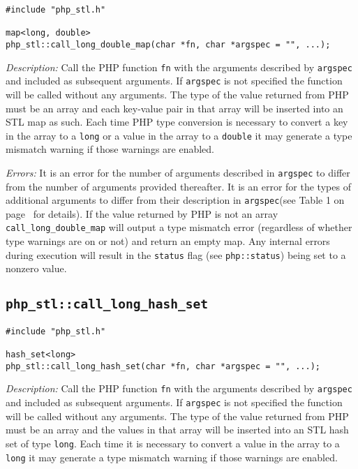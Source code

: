 \documentclass[11pt,titlepage]{article}
\begin{document}
\begin{verbatim}
#include "php_stl.h"

map<long, double> 
php_stl::call_long_double_map(char *fn, char *argspec = "", ...);
\end{verbatim}

\emph{Description:} Call the PHP function \verb|fn| with the arguments described by \verb|argspec| and included as subsequent arguments. If \verb|argspec| is not specified the function will be called without any arguments. The type of the value returned from PHP must be an array and each key-value pair in that array will be inserted into an STL map as such. Each time PHP type conversion is necessary to convert a key in the array to a \verb|long| or a value in the array to a \verb|double| it may generate a type mismatch warning if those warnings are enabled.

\emph{Errors:} It is an error for the number of arguments described in \verb|argspec| to differ from the number of arguments provided thereafter. It is an error for the types of additional arguments to differ from their description in \verb|argspec|(see Table 1 on page~\pageref{Table1} for details). If the value returned by PHP is not an array \verb|call_long_double_map| will output a type mismatch error (regardless of whether type warnings are on or not) and return an empty map. Any internal errors during execution will result in the \verb|status| flag (see \verb|php::status|) being set to a nonzero value.


\subsection{\texttt{php\_stl::call\_long\_hash\_set}}

\begin{verbatim}
#include "php_stl.h"

hash_set<long> 
php_stl::call_long_hash_set(char *fn, char *argspec = "", ...);
\end{verbatim}

\emph{Description:} Call the PHP function \verb|fn| with the arguments described by \verb|argspec| and included as subsequent arguments. If \verb|argspec| is not specified the function will be called without any arguments. The type of the value returned from PHP must be an array and the values in that array will be inserted into an STL hash set of type \verb|long|. Each time it is necessary to convert a value in the array to a \verb|long| it may generate a type mismatch warning if those warnings are enabled.
\end{document}
